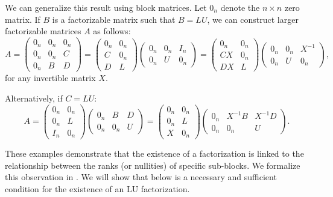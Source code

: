 \documentclass[final]{siamart1116}
\numberwithin{theorem}{section}
\begin{document}
We can generalize this result using block matrices. Let $0_n$ denote the $n \times n$ zero matrix. If $B$ is a factorizable matrix such that $B=LU$, we can construct larger factorizable matrices $A$ as follows:
\[
  A =
  \begin{pmatrix}
    0_n & 0_n & 0_n \\
    0_n & 0_n & C   \\
    0_n & B   & D
  \end{pmatrix}
  =
  \begin{pmatrix}
    0_n & 0_n \\
    C   & 0_n \\
    D   & L
  \end{pmatrix}
  \begin{pmatrix}
    0_n & 0_n & I_n \\
    0_n & U   & 0_n
  \end{pmatrix}
  =
  \begin{pmatrix}
    0_n & 0_n \\
    CX  & 0_n \\
    DX  & L
  \end{pmatrix}
  \begin{pmatrix}
    0_n & 0_n & X^{-1} \\
    0_n & U   & 0_n
  \end{pmatrix},
\]
for any invertible matrix $X$.

Alternatively, if $C = LU$:
\[
  A =
  \begin{pmatrix}
    0_n & 0_n \\
    0_n & L   \\
    I_n & 0_n
  \end{pmatrix}
  \begin{pmatrix}
    0_n & B   & D \\
    0_n & 0_n & U
  \end{pmatrix}
  =
  \begin{pmatrix}
    0_n & 0_n \\
    0_n & L   \\
    X   & 0_n
  \end{pmatrix}
  \begin{pmatrix}
    0_n & X^{-1} B & X^{-1} D \\
    0_n & 0_n      & U
  \end{pmatrix}.
\]

These examples demonstrate that the existence of a factorization is linked to the relationship between the ranks (or nullities) of specific sub-blocks. We formalize this observation in . We will show that  below is a necessary and sufficient condition for the existence of an LU factorization.
\end{document}
